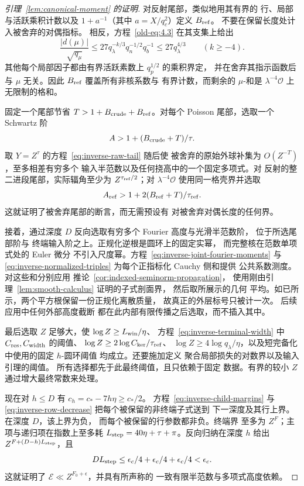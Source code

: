 \documentclass[11pt,a4paper]{article}
\numberwithin{equation}{section}
\numberwithin{figure}{section}
\theoremstyle{definition}
\theoremstyle{remark}
\begin{document}
\begin{proof}[引理~\ref{lem:canonical-moment} 的证明]
对反射尾部，类似地用其有界的
行、局部与活跃乘积计数以及 \(1+a^{-1}\)（其中 \(a=X/q_c^2\)）定义 \(B_{\rm ref}\)。
不要在保留长度处计入被舍弃的对偶指标。
相反，方程~\eqref{old-eq:4.3} 在其支集上给出
\[
 \frac{|d(\mu)|}{\sqrt{q_\mu}}
 \le27q_\lambda^{-k/3}q_n^{-1/2}q_b^{-1}
 \le27q_\lambda^{4/3}\qquad(k\ge-4).
\]
其他每个局部因子都由有界活跃素数上 \(q_p^{1/2}\) 的乘积界定，
并在舍弃其指示函数后与 \(\mu\) 无关。因此 \(B_{\rm ref}\) 覆盖所有非核系数与
有界计数，而剩余的 \(\mu\)-和是
\(\lambda^{-4}\mathcal O\) 上无限制的格和。

固定一个尾部节省 \(T>1+B_{\rm crude}+B_{\rm ref}\)。对每个 Poisson
尾部，选取一个 Schwartz 阶
\[
 A>1+(B_{\rm crude}+T)/\tau.
\]
取 \(Y=Z^\tau\) 的方程~\eqref{eq:inverse-raw-tail} 随后使
被舍弃的原始外球补集为 \(O(Z^{-T})\)，至多相差有穷多个
输入半范数以及任何挠高中的一个固定多项式。对
反射的整二进段尾部，实际辐角至少为
\(Z^{\tau_{\rm ref}/2}\)；对
\(\lambda^{-4}\mathcal O\) 使用同一格壳界并选取
\[
 A_{\rm ref}>1+2(B_{\rm ref}+T)/\tau_{\rm ref}.
\]
这就证明了被舍弃尾部的断言，而无需预设有
对被舍弃对偶长度的任何界。

接着，通过深度 \(D\) 反向选取有穷多个 Fourier 高度与光滑半范数阶，
位于所选尾部阶与
终端输入阶之上。正规化逆根是圆环上的固定实幂，
而完整核在范数单项式处的 Euler 微分
不引入尺度幂。方程~\eqref{eq:inverse-joint-fourier-moments}
与 \eqref{eq:inverse-normalized-triples} 为每个正指标化 Cauchy 侧和提供
公共系数测度。对这些和分别应用
推论~\ref{cor:indexed-seminorm-propagation}，
使用刚由引理~\ref{lem:smooth-calculus} 证明的子式剖面界，
然后取所展示的几何
平均。如已所示，两个平方根保留一份正规化离散质量，
故真正的外层标号只被计一次。
后续应用中任何外部高度截断
都在此内部有限传播之后选取，而不插入其中。

最后选取 \(Z\) 足够大，使 \(\log Z\ge L_{\rm win}/\eta\)、
方程~\eqref{eq:inverse-terminal-width} 中 \(C_{\rm res},C_{\rm width}\) 的阈值、
\(\log Z\ge2\log C_{\rm ker}/\tau_{\rm ref}\)、
\(\log Z\ge4\log q_\lambda/\eta\)，以及短完备化中使用的固定 \(h\)-圆环阈值
均成立。还要施加定义
聚合局部损失的对数界以及输入引理的阈值。
所有选择都先于此最终阈值，且只依赖于固定
数据。有界的较小 \(Z\) 通过增大最终常数来处理。

现在对 \(h\le D\) 有 \(c_h=c_*-7h\eta\ge c_*/2\)。
方程~\eqref{eq:inverse-child-margins} 与
\eqref{eq:inverse-row-decrease} 把每个被保留的非终端子式送到
下一深度及其行上界。在深度 \(D\)，该上界为负，
而每个被保留的行参数都非负。终端界
至多为 \(Z^F\)；主项与递归项在指数上至多耗
\(L_{\rm step}=40\eta+\tau+\pi\)。反向归纳在深度 \(h\) 给出
\(Z^{F+(D-h)L_{\rm step}}\)，且
\[
 D L_{\rm step}\le\epsilon_c/4+\epsilon_c/4+\epsilon_c/4<\epsilon_c.
\]
这就证明了 \(\mathcal E\ll Z^{F_0+\epsilon}\)，并具有所声称的
一致有限半范数与多项式高度依赖。
\end{proof}
\end{document}
